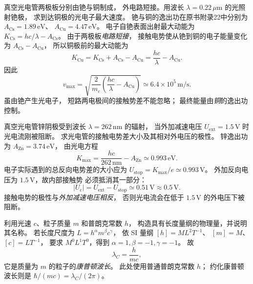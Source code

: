 真空光电管两极板分别由铯与铜制成，
外电路短接。用波长
$\lambda=0.22\,\mu\mathrm m$ 的光照射铯极，
求到达铜极的光电子最大速度。
\exsolution
铯与铜的逸出功在原书附录22中分别为
$A_{\mathrm{Cs}}=1.89\,\mathrm{eV}$、
$A_{\mathrm{Cu}}=4.47\,\mathrm{eV}$。
电子自铯表面出射最大动能为
$K_{\mathrm{Cs}}=hc/\lambda-A_{\mathrm{Cs}}$。
由于两极板\emph{电路短接}，
接触电势使从铯到铜的电子能量变化
为 $A_{\mathrm{Cs}}-A_{\mathrm{Cu}}$，
所以铜极前的最大动能为
\[
 K_{\mathrm{Cu}}=
 K_{\mathrm{Cs}}+A_{\mathrm{Cs}}-A_{\mathrm{Cu}}
 =\frac{hc}{\lambda}-A_{\mathrm{Cu}}.
\]
因此
\[
 \boxed{v_{\max}=\sqrt{\frac{2}{m_e}
 \left(\frac{hc}{\lambda}-A_{\mathrm{Cu}}\right)}
 \simeq6.4\times10^5\,\mathrm{m/s}}.
\]
\excheck 虽由铯产生光电子，
短路两电极间的接触势差不能忽略；
最终能量由\emph{铜}的逸出功控制。

真空光电管锌阴极受到波长
$\lambda=262\,\mathrm{nm}$ 的辐射，
当外加减速电压 $U_{\mathrm{ext}}=1.5\,\mathrm V$
时光电流刚被阻断。
求光电管的接触电势差大小及其相对外电压的极性。
\exsolution
锌逸出功为 $A_{\mathrm{Zn}}=3.74\,\mathrm{eV}$，
由光电方程
\[
 K_{\max}=\frac{hc}{262\,\mathrm{nm}}-A_{\mathrm{Zn}}
 \simeq0.993\,\mathrm{eV}.
\]
电子实际遇到的总反向电势差的大小应为
$U_{\mathrm{stop}}=K_{\max}/e\simeq0.993\,\mathrm V$。
外加反向电压为 $1.5\,\mathrm V$，故内部接触势
必须抵消其一部分：
\[
 \boxed{|U_{\mathrm c}|=
 U_{\mathrm{ext}}-U_{\mathrm{stop}}
 \simeq0.51\,\mathrm V\approx0.5\,\mathrm V}.
\]
\excheck 接触电势的极性与\emph{外加减速电压相反}，
否则光电流会在低于 $1.5\,\mathrm V$ 的外电压下被阻断。

利用光速 $c$、粒子质量 $m$ 和普朗克常数 $h$，
构造具有长度量纲的物理量，并说明其名称。
\exsolution
若长度尺度为 $L=h^\alpha m^\beta c^\gamma$，
依 SI 量纲
$[h]=ML^2T^{-1}$、
$[m]=M$、$[c]=LT^{-1}$，
要求 $M^0L^1T^0$，得到
$\alpha=1,\beta=-1,\gamma=-1$。
故
\[
 \boxed{\lambda_C=\frac{h}{mc}},
\]
它是质量为 $m$ 的粒子的\emph{康普顿波长}。
\excheck 此处使用普通普朗克常数 $h$；
约化康普顿波长则是 $\hbar/(mc)=\lambda_C/(2\pi)$。
